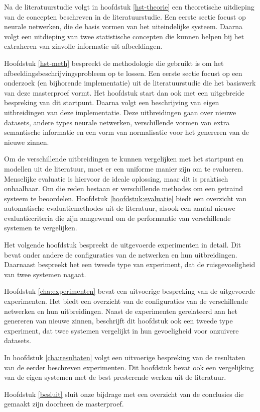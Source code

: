 Na de literatuurstudie volgt in hoofdstuk \ref{hst-theorie} een theoretische uitdieping van de concepten beschreven in de literatuurstudie. Een eerste sectie focust op neurale netwerken, die de basis vormen van het uiteindelijke systeem. Daarna volgt een uitdieping van twee statistische concepten die kunnen helpen bij het extraheren van zinvolle informatie uit afbeeldingen.

Hoofdstuk \ref{hst-meth} bespreekt de methodologie die gebruikt is om het afbeeldingsbeschrijvingsprobleem op te lossen. Een eerste sectie focust op een onderzoek (en bijhorende implementatie) uit de literatuurstudie die het basiswerk van deze masterproef vormt. Het hoofdstuk start dan ook met een uitgebreide bespreking van dit startpunt. Daarna volgt een beschrijving van eigen uitbreidingen van deze implementatie. Deze uitbreidingen gaan over nieuwe datasets, andere types neurale netwerken, verschillende vormen van extra semantische informatie en een vorm van normalisatie voor het genereren van de nieuwe zinnen. 

Om de verschillende uitbreidingen te kunnen vergelijken met het startpunt en modellen uit de literatuur, moet er een uniforme manier zijn om te evalueren. Menselijke evaluatie is hiervoor de ideale oplossing, maar dit is praktisch onhaalbaar. Om die reden bestaan er verschillende methodes om een getraind systeem te beoordelen. Hoofdstuk \ref{hoofdstuk:evaluatie} biedt een overzicht van automatische evaluatiemethodes uit de literatuur, alsook een aantal nieuwe evaluatiecriteria die zijn aangewend om de performantie van verschillende systemen te vergelijken.

Het volgende hoofdstuk bespreekt de uitgevoerde experimenten in detail. Dit bevat onder andere de configuraties van de netwerken en hun uitbreidingen. Daarnaast bespreekt het een tweede type van experiment, dat de ruisgevoeligheid van twee systemen nagaat.

Hoofdstuk \ref{cha:experimenten} bevat een uitvoerige bespreking van de uitgevoerde experimenten. Het biedt een overzicht van de configuraties van de verschillende netwerken en hun uitbreidingen. Naast de experimenten gerelateerd aan het genereren van nieuwe zinnen, beschrijft dit hoofdstuk ook een tweede type experiment, dat twee systemen vergelijkt in hun gevoeligheid voor onzuivere datasets.

In hoofdstuk \ref{cha:resultaten} volgt een uitvoerige bespreking van de resultaten van de eerder beschreven experimenten. Dit hoofdstuk bevat ook een vergelijking van de eigen systemen met de best presterende werken uit de literatuur.

Hoofdstuk \ref{besluit} sluit onze bijdrage met een overzicht van de conclusies die gemaakt zijn doorheen de masterproef.
 
